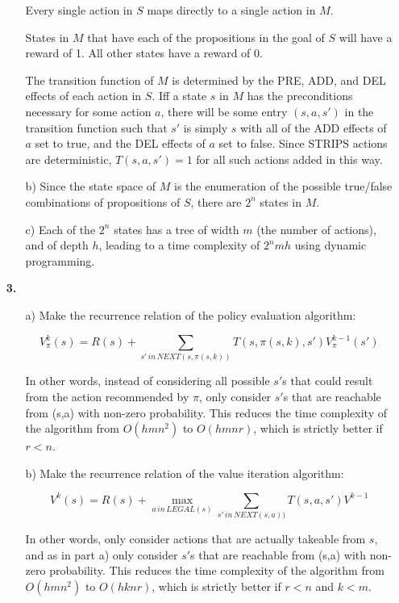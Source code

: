 \documentclass{article}
\begin{document}
\begin{enumerate}
\begin{enumerate}
Every single action in $S$ maps directly to a single action in $M$.

States in $M$ that have each of the propositions in the goal of $S$ will have
a reward of 1. All other states have a reward of 0.

The transition function of $M$ is determined by the PRE, ADD, and DEL effects
of each action in $S$. Iff a state $s$ in $M$ has the preconditions necessary
for some action $a$, there will be some entry $(s,a,s')$ in the transition
function such that $s'$ is simply $s$ with all of the ADD effects of $a$ set
to true, and the DEL effects of $a$ set to false. Since STRIPS actions are
deterministic, $T(s,a,s') = 1$ for all such actions added in this way.

\item[b)]
Since the state space of $M$ is the enumeration of the possible true/false
combinations of propositions of $S$, there are $2^n$ states in $M$.

\item[c)]
Each of the $2^n$ states has a tree of width $m$ (the number of actions), and
of depth $h$, leading to a time complexity of $2^nmh$ using dynamic programming.

\end{enumerate}

\item[\textbf{3.}]
\begin{enumerate}
\item[a)]
Make the recurrence relation of the policy evaluation algorithm:

\[
V^k_\pi(s) = R(s) + \sum_{s' \, in \, NEXT(s,\pi(s,k))}
T(s,\pi(s,k),s')V^{k-1}_\pi(s')
\]

In other words, instead of considering all possible $s'$s that could result
from the action recommended by $\pi$, only consider $s'$s that are reachable
from (s,a) with non-zero probability. This reduces the time complexity of the
algorithm from $O(hmn^2)$ to $O(hmnr)$, which is strictly better if $r < n$.
\item[b)]
Make the recurrence relation of the value iteration algorithm:

\[
V^k(s) = R(s) + \max_{a \, in \, LEGAL(s)} \sum_{s' \, in \, NEXT(s,a))}
T(s,a,s')V^{k-1}
\]

In other words, only consider actions that are actually takeable from $s$, and
as in part a) only consider $s'$s that are reachable from (s,a) with non-zero
probability. This reduces the time complexity of the algorithm from $O(hmn^2)$
to $O(hknr)$, which is strictly better if $r < n$ and $k < m$.

\end{enumerate}
\end{enumerate}
\end{document}
